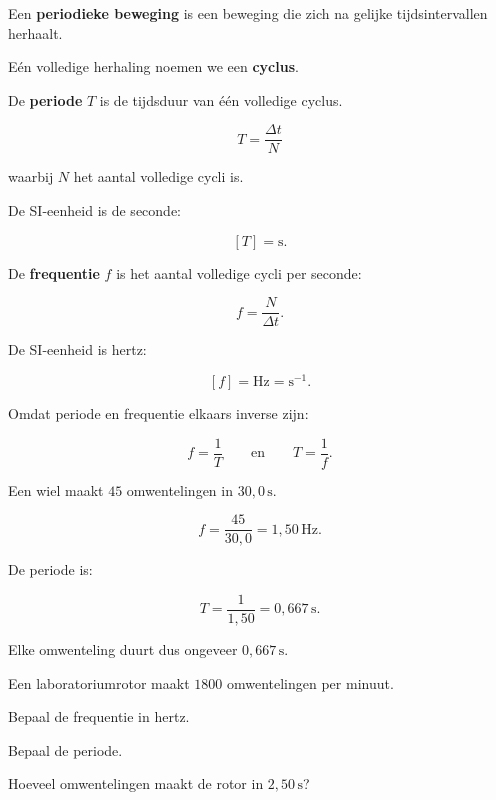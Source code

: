 \documentclass{ximera}
\begin{document}
\begin{definitie}
Een \textbf{periodieke beweging} is een beweging die zich na gelijke
tijdsintervallen herhaalt.
\end{definitie}

Eén volledige herhaling noemen we een \textbf{cyclus}.



De \textbf{periode} $T$ is de tijdsduur van één volledige cyclus.

\[
\boxed{T=\frac{\Delta t}{N}}
\]

waarbij $N$ het aantal volledige cycli is.

De SI-eenheid is de seconde:

\[
[T]=\mathrm{s}.
\]



De \textbf{frequentie} $f$ is het aantal volledige cycli per seconde:

\[
\boxed{f=\frac{N}{\Delta t}}.
\]

De SI-eenheid is hertz:

\[
[f]=\mathrm{Hz}=\mathrm{s^{-1}}.
\]

Omdat periode en frequentie elkaars inverse zijn:

\[
\boxed{f=\frac1T}
\qquad\text{en}\qquad
\boxed{T=\frac1f}.
\]


\begin{voorbeeld}

Een wiel maakt $45$ omwentelingen in $30,0\,\mathrm{s}$.

\[
f=\frac{45}{30,0}=1,50\,\mathrm{Hz}.
\]

De periode is:

\[
T=\frac1{1,50}=0,667\,\mathrm{s}.
\]

Elke omwenteling duurt dus ongeveer $0,667\,\mathrm{s}$.

\end{voorbeeld}


\begin{oefening}{\oefB\ESS}

Een laboratoriumrotor maakt $1800$ omwentelingen per minuut.

\begin{question}
Bepaal de frequentie in hertz.
\end{question}

\begin{question}
Bepaal de periode.
\end{question}

\begin{question}
Hoeveel omwentelingen maakt de rotor in $2,50\,\mathrm{s}$?
\end{question}

\end{oefening}
\end{document}
